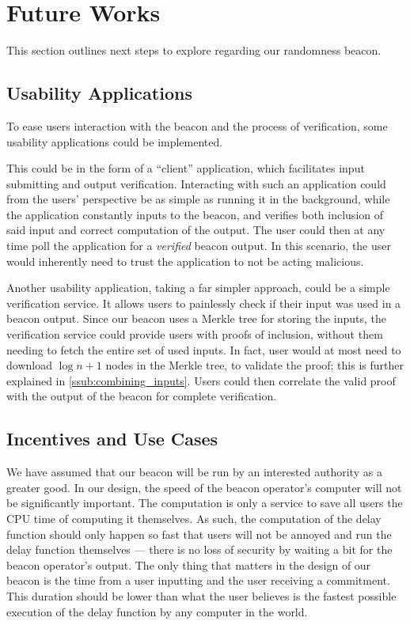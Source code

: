 \section{Future Works}%
\label{sec:future_works}
This section outlines next steps to explore regarding our randomness beacon.

\subsection{Usability Applications}%
\label{sub:usability_applications}
To ease users interaction with the beacon and the process of verification, some usability applications could be implemented.

This could be in the form of a \enquote{client} application, which facilitates input submitting and output verification.
Interacting with such an application could from the users' perspective be as simple as running it in the background, while the application constantly inputs to the beacon, and verifies both inclusion of said input and correct computation of the output.
The user could then at any time poll the application for a \emph{verified} beacon output.
In this scenario, the user would inherently need to trust the application to not be acting malicious.

Another usability application, taking a far simpler approach, could be a simple verification service.
It allows users to painlessly check if their input was used in a beacon output.
Since our beacon uses a Merkle tree for storing the inputs, the verification service could provide users with proofs of inclusion, without them needing to fetch the entire set of used inputs.
In fact, user would at most need to download $\log{n} + 1$ nodes in the Merkle tree, to validate the proof; this is further explained in \vref{ssub:combining_inputs}.
Users could then correlate the valid proof with the output of the beacon for complete verification.

\subsection{Incentives and Use Cases}
We have assumed that our beacon will be run by an interested authority as a greater good. In our design, the speed of the beacon operator's computer will not be significantly important. The computation is only a service to save all users the CPU time of computing it themselves. As such, the computation of the delay function should only happen so fast that users will not be annoyed and run the delay function themselves --- there is no loss of security by waiting a bit for the beacon operator's output. The only thing that matters in the design of our beacon is the time from a user inputting and the user receiving a commitment. This duration should be lower than what the user believes is the fastest possible execution of the delay function by any computer in the world.

